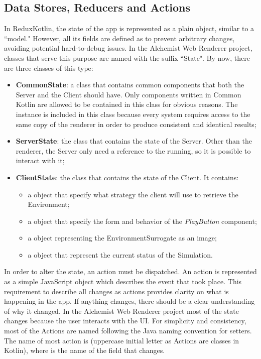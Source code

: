 \subsection{Data Stores, Reducers and Actions}
\label{ssec:data-stores-reducers-and-actions}
In ReduxKotlin, the state of the app is represented as a plain object, similar to a ``model." However, all its fields are defined as  to prevent arbitrary changes, avoiding potential hard-to-debug issues. In the Alchemist Web Renderer project, classes that serve this purpose are named with the suffix ``State". By now, there are three classes of this type:
\begin{itemize}
	\item \textbf{CommonState}: a class that contains common components that both the Server and the Client should have. Only components written in Common Kotlin are allowed to be contained in this class for obvious reasons. The  instance is included in this class because every system requires access to the same copy of the renderer in order to produce consistent and identical results;
	\item \textbf{ServerState}: the class that contains the state of the Server. Other than the renderer, the Server only need a reference to the  running, so it is possible to interact with it;
	\item \textbf{ClientState}: the class that contains the state of the Client. It contains:
	\begin{itemize}
		\item a  object that specify what strategy the client will use to retrieve the Environment;
		\item a  object that specify the form and behavior of the \textit{PlayButton} component;
		\item a  object representing the EnvironmentSurrogate as an image;
		\item a  object that represent the current status of the Simulation.
	\end{itemize}
\end{itemize}


In order to alter the state, an action must be dispatched. An action is represented as a simple JavaScript object which describes the event that took place. This requirement to describe all changes as actions provides clarity on what is happening in the app. If anything changes, there should be a clear understanding of why it changed. In the Alchemist Web Renderer project most of the state changes because the user interacts with the UI. For simplicity and consistency, most of the Actions are named following the Java naming convention for setters. The name of most action is  (uppercase initial letter as Actions are classes in Kotlin), where  is the name of the field that changes.\newline

